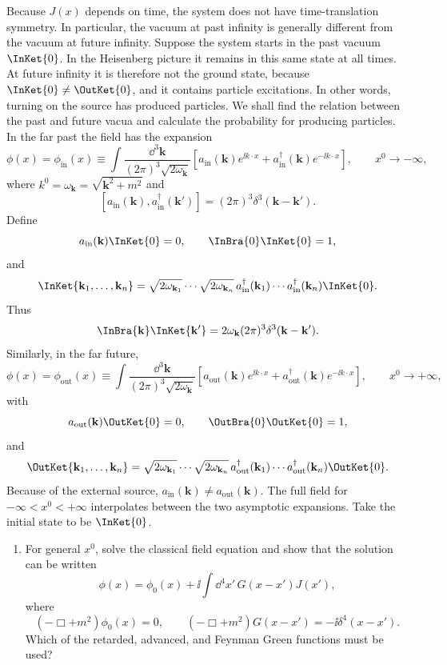 \begin{enumerate}
Because \(J(x)\) depends on time, the system does not have time-translation
symmetry.  In particular, the vacuum at past infinity is generally different
from the vacuum at future infinity.  Suppose the system starts in the past
vacuum \(\InKet{0}\).  In the Heisenberg picture it remains in this same state
at all times.  At future infinity it is therefore not the ground state,
because \(\InKet{0}\ne\OutKet{0}\), and it contains particle excitations.  In
other words, turning on the source has produced particles.  We shall find the
relation between the past and future vacua and calculate the probability for
producing particles.  In the far past the field has the expansion
\[
 \phi(x)=\phi_{\mathrm{in}}(x)\equiv
 \int\frac{\dd^3\mathbf k}{(2\pi)^3\sqrt{2\omega_{\mathbf k}}}
 \left[a_{\mathrm{in}}(\mathbf k)e^{\ii k\cdot x}
 +a_{\mathrm{in}}^\dagger(\mathbf k)e^{-\ii k\cdot x}\right],
 \qquad x^0\longrightarrow-\infty,
\]
where \(k^0=\omega_{\mathbf k}=\sqrt{\mathbf k^2+m^2}\) and
\[
 [a_{\mathrm{in}}(\mathbf k),a_{\mathrm{in}}^\dagger(\mathbf k')]
 =(2\pi)^3\delta^3(\mathbf k-\mathbf k').
\]
Define
\[
 a_{\mathrm{in}}(\mathbf k)\InKet{0}=0,
 \qquad \InBra{0}\InKet{0}=1,
\]
and
\[
 \InKet{\mathbf k_1,\ldots,\mathbf k_n}
 =\sqrt{2\omega_{\mathbf k_1}}\cdots\sqrt{2\omega_{\mathbf k_n}}\,
 a_{\mathrm{in}}^\dagger(\mathbf k_1)\cdots
 a_{\mathrm{in}}^\dagger(\mathbf k_n)\InKet{0}.
\]
Thus
\[
 \InBra{\mathbf k}\InKet{\mathbf k'}
 =2\omega_{\mathbf k}(2\pi)^3\delta^3(\mathbf k-\mathbf k').
\]
Similarly, in the far future,
\[
 \phi(x)=\phi_{\mathrm{out}}(x)\equiv
 \int\frac{\dd^3\mathbf k}{(2\pi)^3\sqrt{2\omega_{\mathbf k}}}
 \left[a_{\mathrm{out}}(\mathbf k)e^{\ii k\cdot x}
 +a_{\mathrm{out}}^\dagger(\mathbf k)e^{-\ii k\cdot x}\right],
 \qquad x^0\longrightarrow+\infty,
\]
with
\[
 a_{\mathrm{out}}(\mathbf k)\OutKet{0}=0,
 \qquad \OutBra{0}\OutKet{0}=1,
\]
and
\[
 \OutKet{\mathbf k_1,\ldots,\mathbf k_n}
 =\sqrt{2\omega_{\mathbf k_1}}\cdots\sqrt{2\omega_{\mathbf k_n}}\,
 a_{\mathrm{out}}^\dagger(\mathbf k_1)\cdots
 a_{\mathrm{out}}^\dagger(\mathbf k_n)\OutKet{0}.
\]
Because of the external source,
\(a_{\mathrm{in}}(\mathbf k)\ne a_{\mathrm{out}}(\mathbf k)\).  The full field
for \(-\infty<x^0<+\infty\) interpolates between the two asymptotic
expansions.  Take the initial state to be \(\InKet{0}\).

\begin{enumerate}
\item For general \(x^0\), solve the classical field equation and show that
the solution can be written
\[
 \phi(x)=\phi_0(x)+\ii\int \dd^4x'\,G(x-x')J(x'),
\]
where
\[
 (-\Box+m^2)\phi_0(x)=0,
 \qquad
 (-\Box+m^2)G(x-x')=-\ii\delta^4(x-x').
\]
Which of the retarded, advanced, and Feynman Green functions must be used?


\end{enumerate}
\end{enumerate}
